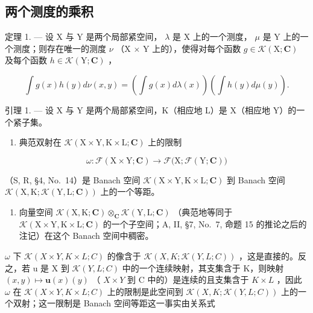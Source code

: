 \subsection{两个测度的乘积}

定理 1. --- 设 X 与 Y 是两个局部紧空间， \(\lambda\) 是 X 上的一个测度， \(\mu\) 是 Y 上的一个测度；则存在唯一的测度 \(\nu\) （X \(\times\) Y 上的），使得对每个函数 \(g \in \mathcal{K}(\mathrm{X};\mathbf{C})\) 及每个函数 \(h \in \mathcal{K}(\mathrm{Y};\mathbf{C})\) ，

\[
\int g (x) h (y) d \nu (x, y) = \left(\int g (x) d \lambda (x)\right) \left(\int h (y) d \mu (y)\right).\tag{1}
\]

引理 1. --- 设 X 与 Y 是两个局部紧空间，K（相应地 L）是 X（相应地 Y）的一个紧子集。

\begin{enumerate}
\def\labelenumi{(\roman{enumi})}
\tightlist
\item
  典范双射在 \(\mathcal{K}(\mathrm{X}\times \mathrm{Y},\mathrm{K}\times \mathrm{L};\mathbf{C})\) 上的限制
\end{enumerate}

\[
\omega : \mathcal {F} (\mathrm{X} \times \mathrm{Y}; \mathbf {C}) \rightarrow \mathcal {F} \bigl (\mathrm{X}; \mathcal {F} (\mathrm{Y}; \mathbf {C}) \bigr)
\]

（S, R, §4, No.~14）是 Banach 空间 \(\mathcal{K}(\mathrm{X}\times\mathrm{Y},\mathrm{K}\times\mathrm{L};\mathbf{C})\) 到 Banach 空间 \(\mathcal{K}(\mathrm{X},\mathrm{K};\mathcal{K}(\mathrm{Y},\mathrm{L};\mathbf{C}))\) 上的一个等距。

\begin{enumerate}
\def\labelenumi{(\roman{enumi})}
\setcounter{enumi}{1}
\tightlist
\item
  向量空间 \(\mathcal{K}(\mathrm{X},\mathrm{K};\mathbf{C})\otimes_{\mathbf{C}}\mathcal{K}(\mathrm{Y},\mathrm{L};\mathbf{C})\) （典范地等同于 \(\mathcal{K}(\mathrm{X}\times \mathrm{Y},\mathrm{K}\times \mathrm{L};\mathbf{C})\) 的一个子空间；A, II, §7, No.~7, 命题 15 的推论之后的注记）在这个 Banach 空间中稠密。
\end{enumerate}

\(\omega\) 下 \(\mathcal{K}(X\times Y,K\times L;C)\) 的像含于 \(\mathcal{K}(X,K;\mathcal{K}(Y,L;C))\) ，这是直接的。反之，若 u 是 X 到 \(\mathcal{K}(Y,L;C)\) 中的一个连续映射，其支集含于 K，则映射 \((x,y)\mapsto\mathbf{u}(x)(y)\) （ \(X\times Y\) 到 C 中的）是连续的且支集含于 \(K\times L\) ，因此 \(\omega\) 在 \(\mathcal{K}(X\times Y,K\times L;C)\) 上的限制是此空间到 \(\mathcal{K}(X,K;\mathcal{K}(Y,L;C))\) 上的一个双射；这一限制是 Banach 空间等距这一事实由关系式

